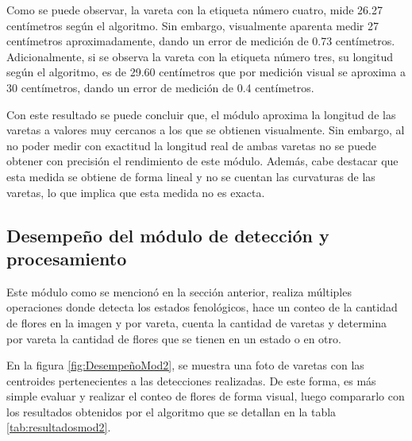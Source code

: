 Como se puede observar, la vareta con la etiqueta número cuatro, mide 26.27 centímetros según el algoritmo. Sin embargo, visualmente aparenta medir 27 centímetros aproximadamente, dando un error de medición de 0.73 centímetros. Adicionalmente, si se observa la vareta con la etiqueta número tres, su longitud según el algoritmo, es de 29.60 centímetros que por medición visual se aproxima a 30 centímetros, dando un error de medición de 0.4 centímetros. 

Con este resultado se puede concluir que, el módulo aproxima la longitud de las varetas a valores muy cercanos a los que se obtienen visualmente. Sin embargo, al no poder medir con exactitud la longitud real de ambas varetas no se puede obtener con precisión el rendimiento de este módulo. Además, cabe destacar que esta medida se obtiene de forma lineal y no se cuentan las curvaturas de las varetas, lo que implica que esta medida no es exacta.

\subsection{Desempeño del módulo de detección y procesamiento}

Este módulo como se mencionó en la sección anterior, realiza múltiples operaciones donde detecta los estados fenológicos, hace un conteo de la cantidad de flores en la imagen y por vareta, cuenta la cantidad de varetas y determina por vareta la cantidad de flores que se tienen en un estado o en otro.

En la figura \ref{fig:DesempeñoMod2}, se muestra una foto de varetas con las centroides pertenecientes a las detecciones realizadas. De este forma, es más simple evaluar y realizar el conteo de flores de forma visual, luego compararlo con los resultados obtenidos por el algoritmo que se detallan en la tabla \ref{tab:resultadosmod2}.

